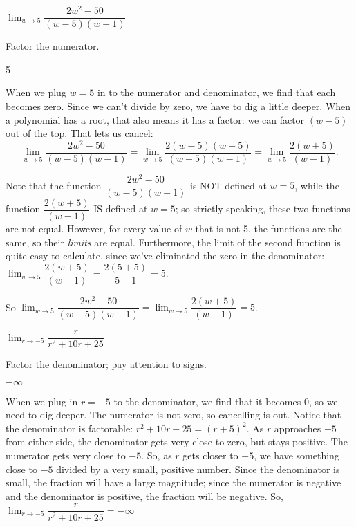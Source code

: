 \begin{question}
$\displaystyle\lim_{w \rightarrow 5} \dfrac{2w^2-50}{(w-5)(w-1)}$
\end{question}
\begin{hint} Factor the numerator.
\end{hint}
\begin{answer} 5
\end{answer}
\begin{solution} When we plug $w=5$ in to the numerator and denominator, we find that each becomes zero. Since we can't divide by zero, we have to dig a little deeper. When a polynomial has a root, that also means it has a factor: we can factor $(w-5)$ out of the top. That lets us cancel:
\[\displaystyle\lim_{w \rightarrow 5} \dfrac{2w^2-50}{(w-5)(w-1)}
=\displaystyle\lim_{w \rightarrow 5} \dfrac{2(w-5)(w+5)}{(w-5)(w-1)}
=\displaystyle\lim_{w \rightarrow 5} \dfrac{2(w+5)}{(w-1)}.
\]

Note that the function $\dfrac{2w^2-50}{(w-5)(w-1)} $ is NOT defined at $w=5$, while the function $\dfrac{2(w+5)}{(w-1)}$ IS defined at $w=5$; so strictly speaking, these two functions are not equal. However, for every value of $w$ that is not 5, the functions are the same, so their \emph{limits} are equal. Furthermore, the limit of the second function is quite easy to calculate, since we've eliminated the zero in the denominator:
$\displaystyle\lim_{w \rightarrow 5} \dfrac{2(w+5)}{(w-1)}
=\dfrac{2(5+5)}{5-1}=5.
$

So $\displaystyle\lim_{w \rightarrow 5} \dfrac{2w^2-50}{(w-5)(w-1)}=\displaystyle\lim_{w \rightarrow 5} \dfrac{2(w+5)}{(w-1)}=5$.
\end{solution}





\begin{Mquestion}
$\displaystyle\lim_{r \rightarrow -5} \dfrac{r}{r^2+10r+25}$
\end{Mquestion}
\begin{hint} Factor the denominator; pay attention to signs.
\end{hint}
\begin{answer} $-\infty$
\end{answer}
\begin{solution}
When we plug in $r=-5$ to the denominator, we find that it becomes 0, so we need to dig deeper. The numerator is not zero, so cancelling is out. Notice that the denominator is factorable: $r^2+10r+25 = (r+5)^2$. As $r$ approaches $-5$ from either side, the denominator gets very close to zero, but stays positive. The numerator gets very close to $-5$. So, as $r$ gets closer to $-5$, we have something close to $-5$ divided by a very small, positive number. Since the denominator is small, the fraction will have a large magnitude; since the numerator is negative and the denominator is positive, the fraction will be negative. So,
$\displaystyle\lim_{r \rightarrow -5} \dfrac{r}{r^2+10r+25}=-\infty$
\end{solution}

